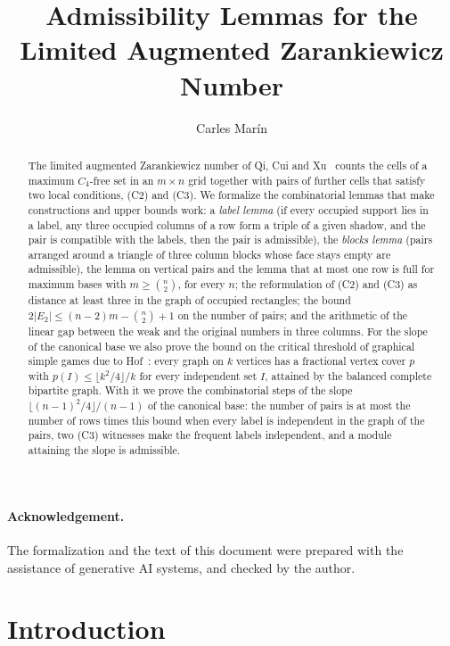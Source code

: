 \documentclass[10pt,a4paper]{article}
\begin{document}
\title{Admissibility Lemmas for the Limited Augmented Zarankiewicz Number}
\author{Carles Mar\'in}
\maketitle

\begin{abstract}
The limited augmented Zarankiewicz number of Qi, Cui and Xu~\cite{QCX-BSR,QCX-L} counts the cells of a maximum
$C_4$-free set in an $m\times n$ grid together with pairs of further cells that satisfy two local conditions, (C2)
and (C3). We formalize the combinatorial lemmas that make constructions and upper bounds work: a \emph{label lemma}
(if every occupied support lies in a label, any three occupied columns of a row form a triple of a given shadow, and
the pair is compatible with the labels, then the pair is admissible), the \emph{blocks lemma} (pairs arranged
around a triangle of three column blocks whose face stays empty are admissible), the lemma on vertical pairs and the
lemma that at most one row is full for maximum bases with $m\ge\binom n2$, for every $n$; the reformulation of (C2)
and (C3) as distance at least three in the graph of occupied rectangles; the bound $2|E_2|\le(n-2)m-\binom n2+1$ on
the number of pairs; and the arithmetic of the linear gap between the weak and the original numbers in three columns. For the slope of
the canonical base we also prove the bound on the critical threshold of graphical simple games due to Hof~\cite{HofMSc,HKKP2018}: every
graph on $k$ vertices has a fractional vertex cover $p$ with $p(I)\le\lfloor k^2/4\rfloor/k$ for every independent
set $I$, attained by the balanced complete bipartite graph. With it we prove the
combinatorial steps of the slope $\lfloor (n-1)^2/4\rfloor/(n-1)$ of the canonical base: the
number of pairs is at most the number of rows times this bound when every label is independent
in the graph of the pairs, two (C3) witnesses make the frequent labels independent, and a module
attaining the slope is admissible.
\end{abstract}

\paragraph{Acknowledgement.} The formalization and the text of this document were prepared with the
assistance of generative AI systems, and checked by the author.

\tableofcontents

\section*{Introduction}
\end{document}
